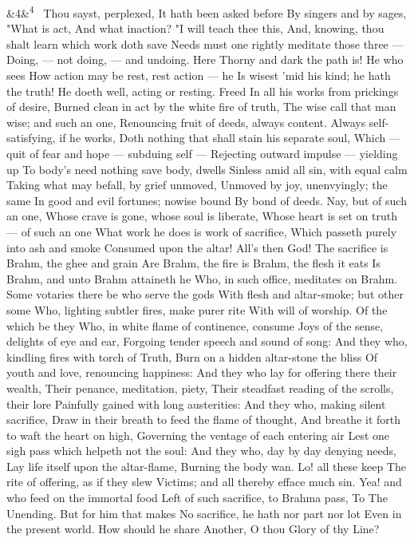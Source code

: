 \documentclass[12pt]{article}
\newcommand{\para}[1][]{\par\noindent\ifx&#1&\else\textsuperscript{\footnotesize #1}~\fi}
\begin{document}
\para[4] Thou sayst, perplexed, It hath been asked before By singers and by sages, "What is act, And what inaction? "I will teach thee this, And, knowing, thou shalt learn which work doth save Needs must one rightly meditate those three --- Doing, --- not doing, --- and undoing. Here Thorny and dark the path is! He who sees How action may be rest, rest action --- he Is wisest 'mid his kind; he hath the truth! He doeth well, acting or resting. Freed In all his works from prickings of desire, Burned clean in act by the white fire of truth, The wise call that man wise; and such an one, Renouncing fruit of deeds, always content. Always self-satisfying, if he works, Doth nothing that shall stain his separate soul, Which --- quit of fear and hope --- subduing self --- Rejecting outward impulse --- yielding up To body's need nothing save body, dwells Sinless amid all sin, with equal calm Taking what may befall, by grief unmoved, Unmoved by joy, unenvyingly; the same In good and evil fortunes; nowise bound By bond of deeds. Nay, but of such an one, Whose crave is gone, whose soul is liberate, Whose heart is set on truth --- of such an one What work he does is work of sacrifice, Which passeth purely into ash and smoke Consumed upon the altar! All's then God! The sacrifice is Brahm, the ghee and grain Are Brahm, the fire is Brahm, the flesh it eats Is Brahm, and unto Brahm attaineth he Who, in such office, meditates on Brahm. Some votaries there be who serve the gods With flesh and altar-smoke; but other some Who, lighting subtler fires, make purer rite With will of worship. Of the which be they Who, in white flame of continence, consume Joys of the sense, delights of eye and ear, Forgoing tender speech and sound of song: And they who, kindling fires with torch of Truth, Burn on a hidden altar-stone the bliss Of youth and love, renouncing happiness: And they who lay for offering there their wealth, Their penance, meditation, piety, Their steadfast reading of the scrolls, their lore Painfully gained with long austerities: And they who, making silent sacrifice, Draw in their breath to feed the flame of thought, And breathe it forth to waft the heart on high, Governing the ventage of each entering air Lest one sigh pass which helpeth not the soul: And they who, day by day denying needs, Lay life itself upon the altar-flame, Burning the body wan. Lo! all these keep The rite of offering, as if they slew Victims; and all thereby efface much sin. Yea! and who feed on the immortal food Left of such sacrifice, to Brahma pass, To The Unending. But for him that makes No sacrifice, he hath nor part nor lot Even in the present world. How should he share Another, O thou Glory of thy Line?
\end{document}
